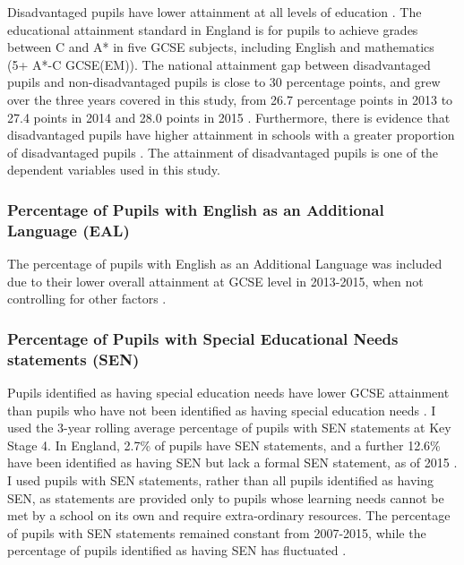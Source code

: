 \documentclass[12pt, a4paper]{article}
\begin{document}
Disadvantaged pupils have lower attainment at all levels of education \autocites{departmentforeducation2014b, departmentforeducation2015b, departmentforeducation2016, macleod2015}. The educational attainment standard in England is for pupils to achieve grades between C and A* in five GCSE subjects, including English and mathematics (5+ A*-C GCSE(EM)). The national attainment gap between disadvantaged pupils and non-disadvantaged pupils is close to 30 percentage points, and grew over the three years covered in this study, from 26.7 percentage points in 2013 to 27.4 points in 2014 and 28.0 points in 2015 \autocites{departmentforeducation2014b, departmentforeducation2015b, departmentforeducation2016}. Furthermore, there is evidence that disadvantaged pupils have higher attainment in schools with a greater proportion of disadvantaged pupils \autocites{macleod2015}. The attainment of disadvantaged pupils is one of the dependent variables used in this study.

\subsubsection{Percentage of Pupils with English as an Additional Language (EAL)}

The percentage of pupils with English as an Additional Language was included due to their lower overall attainment at GCSE level in 2013-2015, when not controlling for other factors \autocites{departmentforeducation2014b, departmentforeducation2015b, departmentforeducation2016}.

\subsubsection{Percentage of Pupils with Special Educational Needs statements (SEN)}

Pupils identified as having special education needs have lower GCSE attainment than pupils who have not been identified as having special education needs \autocites{departmentforeducation2014b, departmentforeducation2015b, departmentforeducation2016}. I used the 3-year rolling average percentage of pupils with SEN statements at Key Stage 4. In England, 2.7\% of pupils have SEN statements, and a further 12.6\% have been identified as having SEN but lack a formal SEN statement, as of 2015 \autocites{departmentforeducation2015a}. I used pupils with SEN statements, rather than all pupils identified as having SEN, as statements are provided only to pupils whose learning needs cannot be met by a school on its own \autocites{departmentforeducation2015c} and require extra-ordinary resources. The percentage of pupils with SEN statements remained constant from 2007-2015, while the percentage of pupils identified as having SEN has fluctuated \autocites{departmentforeducation2015a}.
\end{document}
